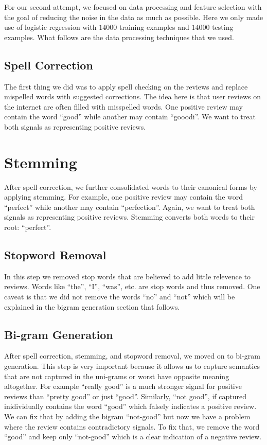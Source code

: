 For our second attempt, we focused on data processing and feature
selection with the goal of reducing the noise in the data as much
as possible. Here we only made use of logistic regression with $14000$
training examples and $14000$ testing examples. What follows are
the data processing techniques that we used.


\subsection*{Spell Correction}

The first thing we did was to apply spell checking on the reviews
and replace mispelled words with suggested corrections. The idea here
is that user reviews on the internet are often filled with misspelled
words. One positive review may contain the word ``good'' while another
may contain ``gooodi''. We want to treat both signals as representing
positive reviews.


\section*{Stemming}

After spell correction, we further consolidated words to their canonical
forms by applying stemming. For example, one positive review may contain
the word ``perfect'' while another may contain ``perfection''.
Again, we want to treat both signals as representing positive reviews.
Stemming converts both words to their root: ``perfect''.


\subsection*{Stopword Removal}

In this step we removed stop words that are believed to add little
relevence to reviews. Words like ``the'', ``I'', ``was'', etc.
are stop words and thus removed. One caveat is that we did not remove
the words ``no'' and ``not'' which will be explained in the bigram
generation section that follows.


\subsection*{Bi-gram Generation}

After spell correction, stemming, and stopword removal, we moved on
to bi-gram generation. This step is very important because it allows
us to capture semantics that are not captured in the uni-grams or
worst have opposite meaning altogether. For example ``really good''
is a much stronger signal for positive reviews than ``pretty good''
or just ``good''. Similarly, ``not good'', if captured inidividually
contains the word ``good'' which falsely indicates a positive review.
We can fix that by adding the bigram ``not-good'' but now we have
a problem where the review contains contradictory signals. To fix
that, we remove the word ``good'' and keep only ``not-good'' which
is a clear indication of a negative review.


